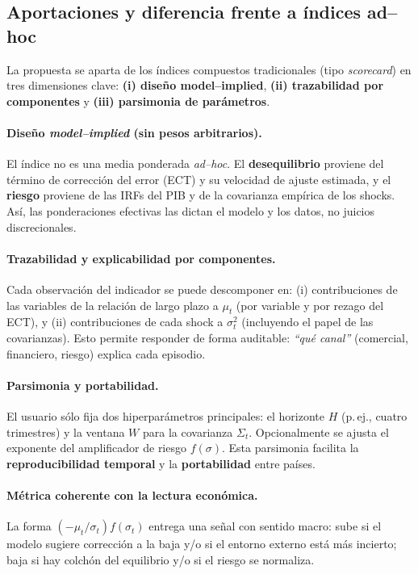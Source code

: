 \documentclass[11pt,a4paper]{article}
\newcommand{\1}{\mathbf{1}}
\begin{document}
\subsection{Aportaciones y diferencia frente a índices ad--hoc}

La propuesta se aparta de los índices compuestos tradicionales (tipo \emph{scorecard}) en tres dimensiones clave: 
\textbf{(i) diseño model--implied}, \textbf{(ii) trazabilidad por componentes} y \textbf{(iii) parsimonia de parámetros}.

\paragraph{Diseño \emph{model--implied} (sin pesos arbitrarios).}
El índice no es una media ponderada \emph{ad--hoc}. El \textbf{desequilibrio} proviene del término de corrección del error (ECT) y su velocidad de ajuste estimada, y el \textbf{riesgo} proviene de las IRFs del PIB y de la covarianza empírica de los shocks. 
Así, las ponderaciones efectivas las dictan el modelo y los datos, no juicios discrecionales.

\paragraph{Trazabilidad y explicabilidad por componentes.}
Cada observación del indicador se puede descomponer en:
(i) contribuciones de las variables de la relación de largo plazo a $\mu_t$ (por variable y por rezago del ECT), y 
(ii) contribuciones de cada shock a $\sigma_t^2$ (incluyendo el papel de las covarianzas). 
Esto permite responder de forma auditable: \emph{``qué canal''} (comercial, financiero, riesgo) explica cada episodio.

\paragraph{Parsimonia y portabilidad.}
El usuario sólo fija dos hiperparámetros principales: el horizonte $H$ (p.\,ej., cuatro trimestres) y la ventana $W$ para la covarianza \(\Sigma_t\). 
Opcionalmente se ajusta el exponente del amplificador de riesgo $f(\sigma)$.
Esta parsimonia facilita la \textbf{reproducibilidad temporal} y la \textbf{portabilidad} entre países.

\paragraph{Métrica coherente con la lectura económica.}
La forma $\left(-\mu_t/\sigma_t\right)f(\sigma_t)$ entrega una señal con sentido macro:
sube si el modelo sugiere corrección a la baja y/o si el entorno externo está más incierto; 
baja si hay colchón del equilibrio y/o si el riesgo se normaliza.
\end{document}
